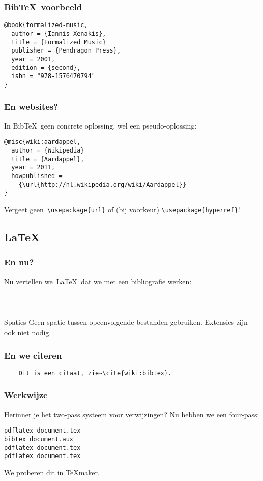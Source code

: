 \begin{frame}[fragile]
  \frametitle{Bib\TeX\ voorbeeld}

  \begin{verbatim}
@book{formalized-music,
  author = {Iannis Xenakis},
  title = {Formalized Music}
  publisher = {Pendragon Press},
  year = 2001,
  edition = {second},
  isbn = "978-1576470794"
}
  \end{verbatim}
\end{frame}

\begin{frame}[fragile]
  \frametitle{En websites?}

  In Bib\TeX\ geen concrete oplossing, wel een pseudo-oplossing:
  \begin{verbatim}
@misc{wiki:aardappel,
  author = {Wikipedia}
  title = {Aardappel},
  year = 2011,
  howpublished =
    {\url{http://nl.wikipedia.org/wiki/Aardappel}}
}
  \end{verbatim}
  Vergeet geen~\verb|\usepackage{url}| of (bij voorkeur) \verb|\usepackage{hyperref}|!
\end{frame}

\subsection{\LaTeX}
\begin{frame}[fragile]
  \frametitle{En nu?}

  Nu vertellen we~\LaTeX\ dat we met een bibliografie werken:
  \begin{verbatim}



  \end{verbatim}
  \begin{alertblock}{Spaties}
	Geen spatie tussen opeenvolgende bestanden gebruiken. Extensies zijn ook niet nodig.
  \end{alertblock}
\end{frame}

\begin{frame}[fragile]
  \frametitle{En we citeren}

  \begin{verbatim}
	Dit is een citaat, zie~\cite{wiki:bibtex}.
  \end{verbatim}
\end{frame}

\begin{frame}[fragile]
  \frametitle{Werkwijze}

  Herinner je het two-pass systeem voor verwijzingen? Nu hebben we een four-pass:
  \begin{verbatim}
pdflatex document.tex
bibtex document.aux
pdflatex document.tex
pdflatex document.tex\end{verbatim}
We proberen dit in \TeX maker.
\end{frame}

